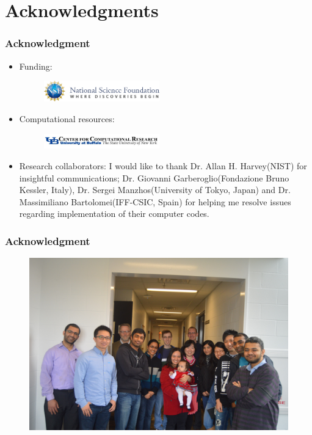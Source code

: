 \documentclass[xcolor=svgnames]{beamer}
\begin{document}
	\section*{Acknowledgments}
        \begin{frame}
            \frametitle{Acknowledgment}
            \begin{itemize}
                \item Funding:
                \begin{figure}
                    \centering
                    \includegraphics[width=5cm,keepaspectratio]{nsfLogo.png}
                \end{figure}
                \item Computational resources:
                \begin{figure}
                    \includegraphics[width=5cm,keepaspectratio]{ccrLogo.jpg}
                \end{figure}
                \item Research collaborators: I would like to thank Dr. Allan H. Harvey(NIST) for insightful communications; Dr. Giovanni Garberoglio(Fondazione Bruno Kessler, Italy), Dr. Sergei Manzhos(University of Tokyo, Japan) and Dr. Massimiliano Bartolomei(IFF-CSIC, Spain) for helping me resolve issues regarding implementation of their computer codes.
            \end {itemize}
        \end{frame}
        \begin{frame}
            \frametitle{Acknowledgment}
            \begin{figure}
                \centering
                \includegraphics[scale=0.06,keepaspectratio]{groupPic.jpg}
            \end{figure}
        \end{frame}
\end{document}
